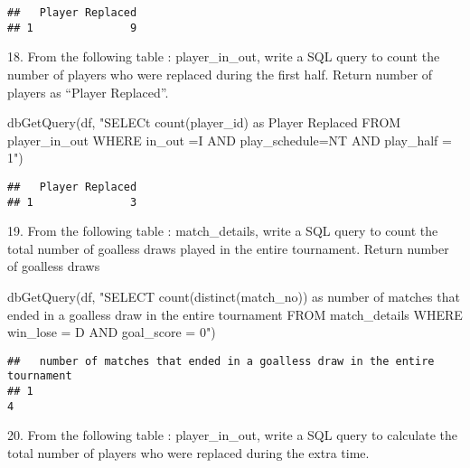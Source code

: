\documentclass[
]{article}
\newenvironment{Shaded}{\begin{snugshade}}{\end{snugshade}}
\newcommand{\FunctionTok}[1]{\textcolor[rgb]{0.00,0.00,0.00}{#1}}
\newcommand{\NormalTok}[1]{#1}
\newcommand{\StringTok}[1]{\textcolor[rgb]{0.31,0.60,0.02}{#1}}
\begin{document}
\begin{verbatim}
##   Player Replaced
## 1               9
\end{verbatim}

18. From the following table : player\_in\_out, write a SQL query to
count the number of players who were replaced during the first half.
Return number of players as ``Player Replaced''.

\begin{Shaded}
\begin{Highlighting}[]
\FunctionTok{dbGetQuery}\NormalTok{(df, }\StringTok{"SELECt  count(player\_id) as \textquotesingle{}Player Replaced\textquotesingle{}}
\StringTok{                FROM player\_in\_out}
\StringTok{                WHERE in\_out =\textquotesingle{}I\textquotesingle{} AND play\_schedule=\textquotesingle{}NT\textquotesingle{} AND play\_half = \textquotesingle{}1\textquotesingle{}"}\NormalTok{)}
\end{Highlighting}
\end{Shaded}

\begin{verbatim}
##   Player Replaced
## 1               3
\end{verbatim}

19. From the following table : match\_details, write a SQL query to
count the total number of goalless draws played in the entire
tournament. Return number of goalless draws

\begin{Shaded}
\begin{Highlighting}[]
\FunctionTok{dbGetQuery}\NormalTok{(df, }\StringTok{"SELECT count(distinct(match\_no)) as \textquotesingle{}number of matches that ended in a goalless draw in the entire tournament\textquotesingle{} }
\StringTok{                FROM match\_details}
\StringTok{                WHERE win\_lose = \textquotesingle{}D\textquotesingle{} AND goal\_score = 0"}\NormalTok{)}
\end{Highlighting}
\end{Shaded}

\begin{verbatim}
##   number of matches that ended in a goalless draw in the entire tournament
## 1                                                                        4
\end{verbatim}

20. From the following table : player\_in\_out, write a SQL query to
calculate the total number of players who were replaced during the extra
time.
\end{document}

